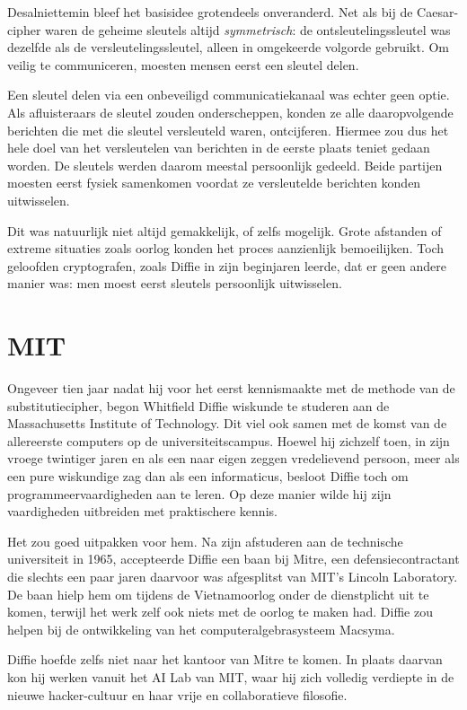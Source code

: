 \documentclass[smalldemyvopaper,11pt,twoside,onecolumn,openright,extrafontsizes,hidelinks]{memoir}
\begin{document}
Desalniettemin bleef het basisidee grotendeels onveranderd. Net als bij
de Caesar-cipher waren de geheime sleutels altijd \emph{symmetrisch}: de
ontsleutelingssleutel was dezelfde als de versleutelingssleutel, alleen
in omgekeerde volgorde gebruikt. Om veilig te communiceren, moesten
mensen eerst een sleutel delen.

Een sleutel delen via een onbeveiligd communicatiekanaal was echter geen
optie. Als afluisteraars de sleutel zouden onderscheppen, konden ze alle
daaropvolgende berichten die met die sleutel versleuteld waren,
ontcijferen. Hiermee zou dus het hele doel van het versleutelen van
berichten in de eerste plaats teniet gedaan worden. De sleutels werden
daarom meestal persoonlijk gedeeld. Beide partijen moesten eerst fysiek
samenkomen voordat ze versleutelde berichten konden uitwisselen.

Dit was natuurlijk niet altijd gemakkelijk, of zelfs mogelijk. Grote
afstanden of extreme situaties zoals oorlog konden het proces
aanzienlijk bemoeilijken. Toch geloofden cryptografen, zoals Diffie in
zijn beginjaren leerde, dat er geen andere manier was: men moest eerst
sleutels persoonlijk uitwisselen.

\section{MIT}\label{mit}

Ongeveer tien jaar nadat hij voor het eerst kennismaakte met de methode
van de substitutiecipher, begon Whitfield Diffie wiskunde te studeren
aan de Massachusetts Institute of Technology. Dit viel ook samen met de
komst van de allereerste computers op de universiteitscampus. Hoewel hij
zichzelf toen, in zijn vroege twintiger jaren en als een naar eigen
zeggen vredelievend persoon, meer als een pure wiskundige zag dan als
een informaticus, besloot Diffie toch om programmeervaardigheden aan te
leren. Op deze manier wilde hij zijn vaardigheden uitbreiden met
praktischere kennis.

Het zou goed uitpakken voor hem. Na zijn afstuderen aan de technische
universiteit in 1965, accepteerde Diffie een baan bij Mitre, een
defensiecontractant die slechts een paar jaren daarvoor was afgesplitst
van MIT's Lincoln Laboratory. De baan hielp hem om tijdens de
Vietnamoorlog onder de dienstplicht uit te komen, terwijl het werk zelf
ook niets met de oorlog te maken had. Diffie zou helpen bij de
ontwikkeling van het computeralgebrasysteem Macsyma.

Diffie hoefde zelfs niet naar het kantoor van Mitre te komen. In plaats
daarvan kon hij werken vanuit het AI Lab van MIT, waar hij zich volledig
verdiepte in de nieuwe hacker-cultuur en haar vrije en collaboratieve
filosofie.
\end{document}
